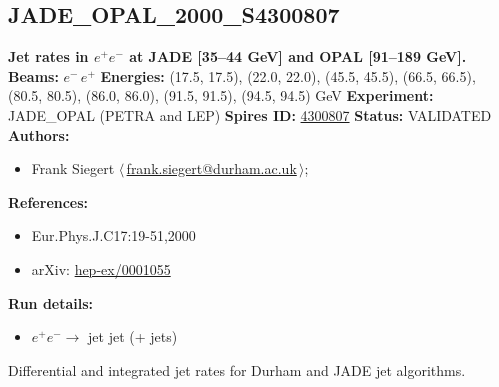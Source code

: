 \subsection[JADE\_OPAL\_2000\_S4300807]{JADE\_OPAL\_2000\_S4300807\,\cite{Pfeifenschneider:1999rz}}
\textbf{Jet rates in $e^+e^-$ at JADE [35--44 GeV] and OPAL [91--189 GeV].}\newline
\textbf{Beams:} $e^-$\,$e^+$ \newline
\textbf{Energies:} (17.5, 17.5), (22.0, 22.0), (45.5, 45.5), (66.5, 66.5), (80.5, 80.5), (86.0, 86.0), (91.5, 91.5), (94.5, 94.5) GeV \newline
\textbf{Experiment:} JADE_OPAL (PETRA and LEP) \newline
\textbf{Spires ID:} \href{http://www.slac.stanford.edu/spires/find/hep/www?rawcmd=key+4300807}{4300807}\newline
\textbf{Status:} VALIDATED\newline
\textbf{Authors:}
\begin{itemize}
  \item Frank Siegert $\langle\,$\href{mailto:frank.siegert@durham.ac.uk}{frank.siegert@durham.ac.uk}$\,\rangle$;
\end{itemize}
\textbf{References:}
\begin{itemize}
  \item Eur.Phys.J.C17:19-51,2000
  \item arXiv: \href{http://arxiv.org/abs/hep-ex/0001055}{hep-ex/0001055}
\end{itemize}
\textbf{Run details:}
\begin{itemize}

  \item $e^+ e^- \to$ jet jet (+ jets)\end{itemize}

\noindent Differential and integrated jet rates for Durham and JADE jet algorithms.

\clearpage


\clearpage

